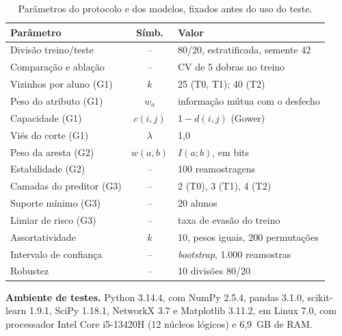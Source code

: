 \begin{table}[ht!]
\centering
\small
\caption{Parâmetros do protocolo e dos modelos, fixados antes do uso do teste.}
\label{tab:hiper}
\begin{tabular}{@{}l c p{3.3cm}@{}}
\hline
\textbf{Parâmetro} & \textbf{Símb.} & \textbf{Valor} \\ \hline
Divisão treino/teste & -- & 80/20, estratificada, semente 42 \\
Comparação e ablação & -- & CV de 5 dobras no treino \\
Vizinhos por aluno (G1) & $k$ & 25 (T0, T1); 40 (T2) \\
Peso do atributo (G1) & $w_a$ & informação mútua com o desfecho \\
Capacidade (G1) & $c(i,j)$ & $1-d(i,j)$ (Gower) \\
Viés do corte (G1) & $\lambda$ & 1,0 \\
Peso da aresta (G2) & $w(a,b)$ & $I(a;b)$, em bits \\
Estabilidade (G2) & -- & 100 reamostragens \\
Camadas do preditor (G3) & -- & 2 (T0), 3 (T1), 4 (T2) \\
Suporte mínimo (G3) & -- & 20 alunos \\
Limiar de risco (G3) & -- & taxa de evasão do treino \\
Assortatividade & $k$ & 10, pesos iguais, 200 permutações \\
Intervalo de confiança & -- & \textit{bootstrap}, 1.000 reamostras \\
Robustez & -- & 10 divisões 80/20 \\ \hline
\end{tabular}
\end{table}

\textbf{Ambiente de testes.} Python 3.14.4, com NumPy 2.5.4, pandas 3.1.0, scikit-learn 1.9.1, SciPy 1.18.1, NetworkX 3.7 e Matplotlib 3.11.2, em Linux 7.0, com processador Intel Core i5-13420H (12 núcleos lógicos) e 6,9~GB de RAM.
